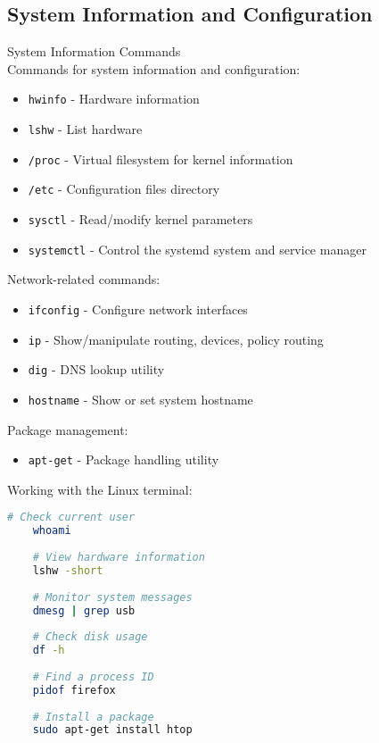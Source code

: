 \subsection{System Information and Configuration}

\begin{definition}{System Information Commands}\\
    Commands for system information and configuration:
    \begin{itemize}
        \item \texttt{hwinfo} - Hardware information
        \item \texttt{lshw} - List hardware
        \item \texttt{/proc} - Virtual filesystem for kernel information
        \item \texttt{/etc} - Configuration files directory
        \item \texttt{sysctl} - Read/modify kernel parameters
        \item \texttt{systemctl} - Control the systemd system and service manager
    \end{itemize}
    
    Network-related commands:
    \begin{itemize}
        \item \texttt{ifconfig} - Configure network interfaces
        \item \texttt{ip} - Show/manipulate routing, devices, policy routing
        \item \texttt{dig} - DNS lookup utility
        \item \texttt{hostname} - Show or set system hostname
    \end{itemize}
    
    Package management:
    \begin{itemize}
        \item \texttt{apt-get} - Package handling utility
    \end{itemize}
\end{definition}

\begin{example}
    Working with the Linux terminal:
    
    \begin{lstlisting}[language=bash, style=basesmol]
    # Check current user
    whoami
    
    # View hardware information
    lshw -short
    
    # Monitor system messages
    dmesg | grep usb
    
    # Check disk usage
    df -h
    
    # Find a process ID
    pidof firefox
    
    # Install a package
    sudo apt-get install htop
    \end{lstlisting}
\end{example}

